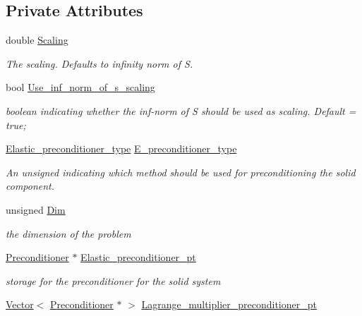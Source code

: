 \subsection*{Private Attributes}
\begin{DoxyCompactItemize}
\item 
double \hyperlink{classoomph_1_1PseudoElasticPreconditioner_a3e2302245fa432f49e3f979cbfe6b3a2}{Scaling}
\begin{DoxyCompactList}\small\item\em The scaling. Defaults to infinity norm of S. \end{DoxyCompactList}\item 
bool \hyperlink{classoomph_1_1PseudoElasticPreconditioner_a3ca651eb7983c61cdaea734b19f2ac25}{Use\+\_\+inf\+\_\+norm\+\_\+of\+\_\+s\+\_\+scaling}
\begin{DoxyCompactList}\small\item\em boolean indicating whether the inf-\/norm of S should be used as scaling. Default = true; \end{DoxyCompactList}\item 
\hyperlink{classoomph_1_1PseudoElasticPreconditioner_acde733e1a111a961d1e714add4e8015d}{Elastic\+\_\+preconditioner\+\_\+type} \hyperlink{classoomph_1_1PseudoElasticPreconditioner_abb84100d37f174e683b2d7a0dd688584}{E\+\_\+preconditioner\+\_\+type}
\begin{DoxyCompactList}\small\item\em An unsigned indicating which method should be used for preconditioning the solid component. \end{DoxyCompactList}\item 
unsigned \hyperlink{classoomph_1_1PseudoElasticPreconditioner_aef0a56e6011e3a7f1c3a2ce171949077}{Dim}
\begin{DoxyCompactList}\small\item\em the dimension of the problem \end{DoxyCompactList}\item 
\hyperlink{classoomph_1_1Preconditioner}{Preconditioner} $\ast$ \hyperlink{classoomph_1_1PseudoElasticPreconditioner_ae5cbfeac8ef38461d7816ca01dbd9eb3}{Elastic\+\_\+preconditioner\+\_\+pt}
\begin{DoxyCompactList}\small\item\em storage for the preconditioner for the solid system \end{DoxyCompactList}\item 
\hyperlink{classoomph_1_1Vector}{Vector}$<$ \hyperlink{classoomph_1_1Preconditioner}{Preconditioner} $\ast$ $>$ \hyperlink{classoomph_1_1PseudoElasticPreconditioner_a705470f8265f77b11eb5a5096a9fe59d}{Lagrange\+\_\+multiplier\+\_\+preconditioner\+\_\+pt}

\end{DoxyCompactItemize}
